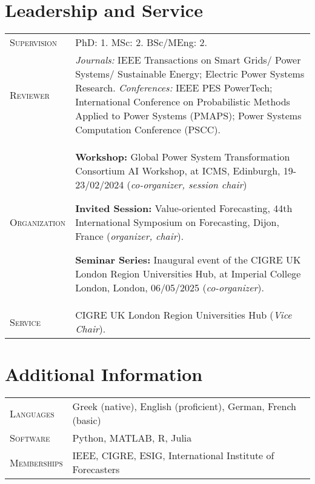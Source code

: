 \documentclass[11pt,a4paper]{article}
\makeatletter
\newlength{\datecolwidth}
\newenvironment{entrylist}{%
  \begin{longtable}{@{}p{\datecolwidth}@{\hspace{0.8em}}p{\dimexpr\linewidth-\datecolwidth-0.8em\relax}@{}}%
}{\end{longtable}}
\newcommand{\entry}[4]{%
  \textbf{#1} & \textbf{#2}\\[-0.2em]
              & {\itshape #3}\\[-0.2em]
              & #4\\[0.8em]
}
\newcommand{\labelstyle}[1]{\textsc{#1}}   %
\newcommand{\entrylabel}[2]{%
  \labelstyle{#1} & #2\\[0.8em]
}
\makeatother
\begin{document}

\section*{Leadership and Service}
\begin{entrylist}
    \entrylabel{Supervision}{%
    PhD: 1.
    MSc: 2.
    BSc/MEng: 2.
  }
  \entrylabel{Reviewer}{%
    \emph{Journals:} IEEE Transactions on Smart Grids/ Power Systems/ Sustainable Energy; Electric Power Systems Research.
    \emph{Conferences:} IEEE PES PowerTech; International Conference on Probabilistic Methods Applied to Power Systems
(PMAPS); Power Systems Computation Conference (PSCC).
  }

  \entrylabel{Organization}{

  \textbf{Workshop:} Global Power System Transformation Consortium AI Workshop, at ICMS, Edinburgh, 19-23/02/2024 (\emph{co-organizer, session chair})

  \textbf{Invited Session:} Value-oriented Forecasting, 44th International Symposium on
Forecasting, Dijon, France (\emph{organizer, chair}).

  \textbf{Seminar Series:} Inaugural event of the CIGRE UK London Region Universities Hub, at Imperial College London, 
  London, 06/05/2025 (\emph{co-organizer}).  }

  \entrylabel{Service}{

  CIGRE UK London Region Universities Hub (\emph{Vice Chair}).

  }

\end{entrylist}


\section*{Additional Information}
\begin{entrylist}
    \entrylabel{Languages}{
      Greek (native), English (proficient), German, French (basic)}
      \entrylabel{Software}{
      Python, MATLAB, R, Julia}
      \entrylabel{Memberships}{
      IEEE, CIGRE, ESIG, International Institute of Forecasters
  }

\end{entrylist}

\end{document}
